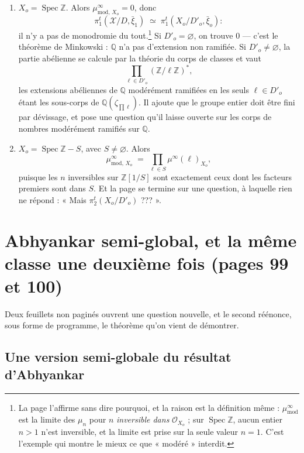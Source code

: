 \documentclass[11pt,a4paper]{article}
\begin{document}
\begin{enumerate}
  \item[a)] $X_{o} = \operatorname{Spec}\mathbb{Z}$. Alors
    $\mu^{\infty}_{\mathrm{mod},\,X_{o}} = 0$, donc
    \[
      \pi_{1}^{t}(\mathcal{X}/D, \bar{\xi}_{1}) \;\simeq\;
      \pi_{1}^{t}(X_{o}/D'_{o}, \bar{\xi}_{o}) :
    \]
    il n'y a pas de monodromie du tout.\footnote{La page l'affirme sans dire
    pourquoi, et la raison est la définition même : $\mu^{\infty}_{\mathrm{mod}}$
    est la limite des $\mu_{n}$ pour $n$ \emph{inversible dans}
    $\mathcal{O}_{X_{o}}$ ; sur $\operatorname{Spec}\mathbb{Z}$, aucun entier
    $n > 1$ n'est inversible, et la limite est prise sur la seule valeur
    $n = 1$. C'est l'exemple qui montre le mieux ce que « modéré » interdit.}
    Si $D'_{o} = \varnothing$, on trouve $0$ --- c'est le théorème de
    Minkowski : $\mathbb{Q}$ n'a pas d'extension non ramifiée. Si
    $D'_{o} \neq \varnothing$, la partie abélienne se calcule par la théorie du
    corps de classes et vaut
    \[
      \prod_{\ell \in D'_{o}} (\mathbb{Z}/\ell\mathbb{Z})^{*} ,
    \]
    les extensions abéliennes de $\mathbb{Q}$ modérément ramifiées en les seuls
    $\ell \in D'_{o}$ étant les sous-corps de
    $\mathbb{Q}(\zeta_{\prod \ell})$. Il ajoute que le groupe entier doit être
    fini par dévissage, et pose une question qu'il laisse ouverte sur les
    corps de nombres modérément ramifiés sur $\mathbb{Q}$.
  \item[b)] $X_{o} = \operatorname{Spec}\mathbb{Z} - S$, avec
    $S \neq \varnothing$. Alors
    \[
      \mu^{\infty}_{\mathrm{mod},\,X_{o}} \;=\;
      \prod_{\ell \in S} \mu^{\infty}(\ell)_{X_{o}} ,
    \]
    puisque les $n$ inversibles sur $\mathbb{Z}[1/S]$ sont exactement ceux dont
    les facteurs premiers sont dans $S$. Et la page se termine sur une
    question, à laquelle rien ne répond : « Mais $\pi_{2}^{t}(X_{o}/D'_{o})$
    ??? ».
\end{enumerate}

\section*{Abhyankar semi-global, et la même classe une deuxième fois (pages 99 et 100)}

Deux feuillets non paginés ouvrent une question nouvelle, et le second
réénonce, sous forme de programme, le théorème qu'on vient de démontrer.

\subsection*{Une version semi-globale du résultat d'Abhyankar}
\end{document}
